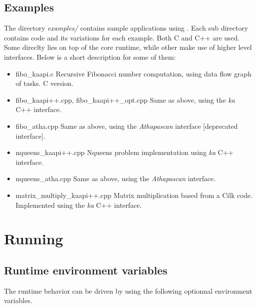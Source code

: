 \subsection{Examples}
The directory \textit{examples/} contains sample applications using \kaapi.
Each sub directory contains code and its variations for each example. 
Both C and C++ are used. Some direclty lies on top of the core runtime,
while other make use of higher level interfaces. Below is a short
description for some of them:
\begin{itemize}
\item fibo\_kaapi.c\newline
Recursive Fibonacci number computation, using data flow graph of tasks. C version.
\item fibo\_kaapi++.cpp, fibo\_kaapi++\_opt.cpp\newline
Same as above, using the \textit{ka} C++ interface.
\item fibo\_atha.cpp\newline
Same as above, using the \textit{Athapascan} interface [deprecated interface].
\item nqueens\_kaapi++.cpp\newline
Nqueens problem implementation using \textit{ka} C++ interface.
\item nqueens\_atha.cpp\newline
Same as above, using the \textit{Athapascan} interface.
\item matrix\_multiply\_kaapi++.cpp\newline
Matrix multiplication based from a Cilk code. Implemented using
the \textit{ka} C++ interface.
\end{itemize}

\section{Running \kaapi}
\subsection{Runtime environment variables}
The runtime behavior can be driven by using the following
optionnal environment variables.

